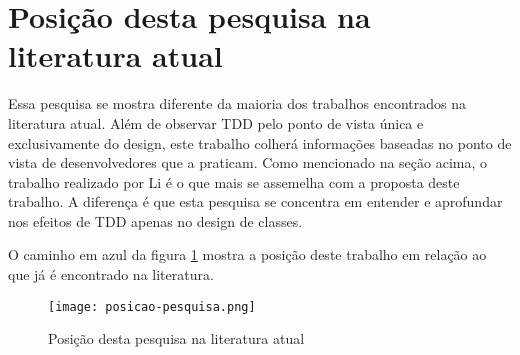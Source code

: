 \section{Posição desta pesquisa na literatura atual}

Essa pesquisa se mostra diferente da maioria dos trabalhos encontrados na
literatura atual. Além de observar TDD pelo ponto de vista única e
exclusivamente do design, este trabalho colherá informações baseadas no ponto de
vista de desenvolvedores que a praticam. 
Como mencionado na seção acima, o trabalho realizado por Li é o que mais se
assemelha com a proposta deste trabalho. A diferença é que esta pesquisa se
concentra em entender e aprofundar nos efeitos de TDD apenas no design de
classes.

O caminho em azul da figura \ref{fig:posicao-pesquisa} mostra a posição deste
trabalho em relação ao que já é encontrado na literatura.

\begin{landscape}
\begin{figure}
  \centering
  \texttt{[image: posicao-pesquisa.png]}
  \caption{Posição desta pesquisa na literatura atual}
  \label{fig:posicao-pesquisa}
\end{figure}
\end{landscape}

